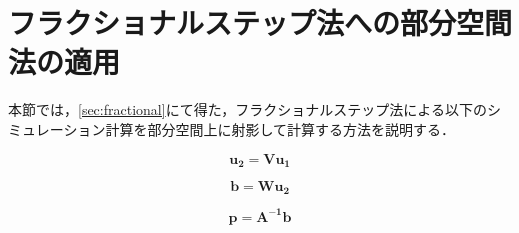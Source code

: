 \documentclass[a4j,12pt]{jreport}
\begin{document}
\section{フラクショナルステップ法への部分空間法の適用}
本節では，\ref{sec:fractional}にて得た，フラクショナルステップ法による以下のシミュレーション計算を部分空間上に射影して計算する方法を説明する．


\[
	\bm{u_2}   =  \mathbf{V}\bm{u_1}
\]

\[
	\bm{b} = \mathbf{W}\bm{u_2}
\]

\[
	\bm{p} = \mathbf{A^{-1}}\bm{b}
\]
\end{document}
